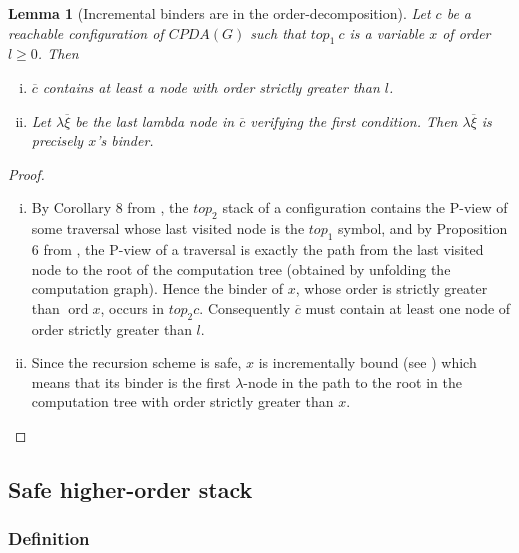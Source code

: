 \documentclass{article}
\newcommand{\ord}{\mathop{\mathrm{ord}}}
\newtheorem{lemma}{Lemma}[section]
\theoremstyle{remark}
\theoremstyle{definition}
\newcommand\orddec\overline
\begin{document}
\begin{lemma}[Incremental binders are in the order-decomposition]
\label{lem:binder_in_ordecompos} Let $c$ be a reachable
configuration of $CPDA(G)$ such that $top_1\
c$ is a variable $x$ of order $l\geq 0$. Then
\begin{enumerate}[i.]
\item $\orddec{c}$ contains at least a node with order strictly
greater than $l$.
\item Let $\lambda \overline{\xi}$ be the last lambda node
in $\orddec{c}$ verifying the first condition. Then $\lambda \overline{\xi}$ is precisely $x$'s binder.
\end{enumerate}
\end{lemma}
\begin{proof}
\begin{enumerate}[i.]
\item By Corollary 8 from \cite{hague-sto07}, the $top_2$
     stack of a configuration contains the P-view of some
    traversal whose last visited node is the $top_1$ symbol, and
    by Proposition 6 from \cite{OngLics2006}, the P-view of a
    traversal is exactly the path from the last visited node to
    the root of the computation tree (obtained by unfolding the
    computation graph). Hence the binder of $x$, whose order
    is strictly greater than $\ord{x}$, occurs in $top_2 c$.
    Consequently $\orddec{c}$ must contain at least one node of order strictly greater than $l$.

\item Since the recursion scheme is safe, $x$ is
 incrementally bound (see \cite{blumong:safelambdacalculus})
 which means that its binder is the first $\lambda$-node in the
 path to the root in the computation tree with order strictly
 greater than $x$.
\end{enumerate}
\end{proof}

\subsection{Safe higher-order stack}
\subsubsection{Definition}
\end{document}
